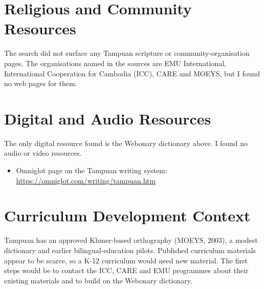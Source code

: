 \documentclass[12pt]{article}
\begin{document}
\section{Religious and Community Resources}
The search did not surface any Tampuan scripture or community-organisation pages. The organisations named in the sources are EMU International, International Cooperation for Cambodia (ICC), CARE and MOEYS, but I found no web pages for them.

\section{Digital and Audio Resources}
The only digital resource found is the Webonary dictionary above. I found no audio or video resources.
\begin{itemize}
\item Omniglot page on the Tampuan writing system: \url{https://omniglot.com/writing/tampuan.htm}
\end{itemize}

\section{Curriculum Development Context}
Tampuan has an approved Khmer-based orthography (MOEYS, 2003), a modest dictionary and earlier bilingual-education pilots. Published curriculum materials appear to be scarce, so a K-12 curriculum would need new material. The first steps would be to contact the ICC, CARE and EMU programmes about their existing materials and to build on the Webonary dictionary.
\end{document}
